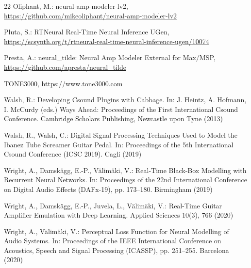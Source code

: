 \documentclass[runningheads,a4paper]{llncs}
\begin{document}
\begin{thebibliography}{22}
 Oliphant, M.: neural-amp-modeler-lv2,
\url{https://github.com/mikeoliphant/neural-amp-modeler-lv2}

 Pluta, S.: RTNeural Real-Time Neural Inference
UGen, \url{https://scsynth.org/t/rtneural-real-time-neural-inference-ugen/10074}

 Presta, A.: neural\_tilde: Neural Amp Modeler
External for Max/MSP, \url{https://github.com/apresta/neural_tilde}

 TONE3000, \url{https://www.tone3000.com}

 Walsh, R.: Developing Csound Plugins with
Cabbage. In: J. Heintz, A. Hofmann, I. McCurdy (eds.) Ways Ahead:
Proceedings of the First International Csound Conference. Cambridge
Scholars Publishing, Newcastle upon Tyne (2013)

 Walsh, R., Walsh, C.: Digital Signal
Processing Techniques Used to Model the Ibanez Tube Screamer Guitar
Pedal. In: Proceedings of the 5th International Csound Conference
(ICSC 2019). Cagli (2019)

 Wright, A., Damsk\"agg, E.-P., V\"alim\"aki, V.:
Real-Time Black-Box Modelling with Recurrent Neural Networks. In:
Proceedings of the 22nd International Conference on Digital Audio Effects
(DAFx-19), pp. 173--180. Birmingham (2019)

 Wright, A., Damsk\"agg, E.-P., Juvela, L.,
V\"alim\"aki, V.: Real-Time Guitar Amplifier Emulation with Deep
Learning. Applied Sciences 10(3), 766 (2020)

 Wright, A., V\"alim\"aki, V.: Perceptual
Loss Function for Neural Modelling of Audio Systems. In: Proceedings of
the IEEE International Conference on Acoustics, Speech and Signal
Processing (ICASSP), pp. 251--255. Barcelona (2020)

\end{thebibliography}
\end{document}
